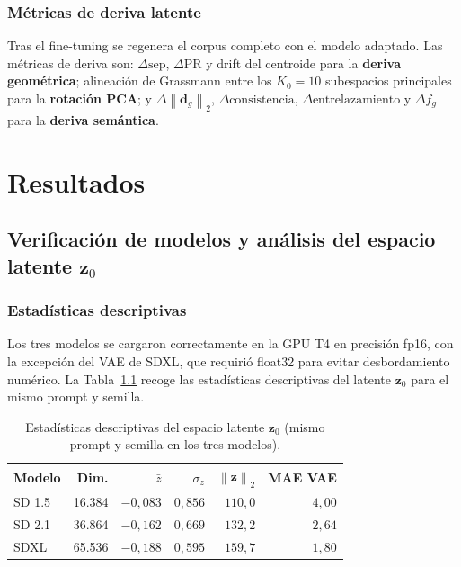 \documentclass[12pt, a4paper, twoside]{book}
\newcommand{\z}{\mathbf{z}}
\newcommand{\norm}[1]{\left\|#1\right\|_2}
\begin{document}
\subsection{Métricas de deriva latente}

Tras el fine-tuning se regenera el corpus completo con el modelo adaptado. Las métricas de deriva son: $\Delta\text{sep}$, $\Delta\text{PR}$ y drift del centroide para la \textbf{deriva geométrica}; alineación de Grassmann entre los $K_0 = 10$ subespacios principales para la \textbf{rotación PCA}; y $\Delta\norm{\mathbf{d}_g}$, $\Delta\text{consistencia}$, $\Delta\text{entrelazamiento}$ y $\Delta f_g$ para la \textbf{deriva semántica}.

\chapter{Resultados}
\label{ch:resultados}

\section{Verificación de modelos y análisis del espacio latente $\z_0$}
\label{sec:res:modelos}

\subsection{Estadísticas descriptivas}

Los tres modelos se cargaron correctamente en la GPU T4 en precisión fp16, con la excepción del VAE de SDXL, que requirió float32 para evitar desbordamiento numérico. La Tabla~\ref{tab:estadisticas_z0} recoge las estadísticas descriptivas del latente $\z_0$ para el mismo prompt y semilla.

\begin{table}[htb]
\centering
\caption{Estadísticas descriptivas del espacio latente $\z_0$ (mismo prompt y semilla en los tres modelos).}
\label{tab:estadisticas_z0}
\small
\begin{tabular}{lrrrrr}
\toprule
\textbf{Modelo} & \textbf{Dim.} & $\bar{z}$ & $\sigma_z$ & $\norm{\z}$ & \textbf{MAE VAE} \\
\midrule
SD 1.5 & 16.384 & $-0{,}083$ & $0{,}856$ & $110{,}0$ & $4{,}00$ \\
SD 2.1 & 36.864 & $-0{,}162$ & $0{,}669$ & $132{,}2$ & $2{,}64$ \\
SDXL   & 65.536 & $-0{,}188$ & $0{,}595$ & $159{,}7$ & $1{,}80$ \\
\bottomrule
\end{tabular}
\end{table}
\end{document}
